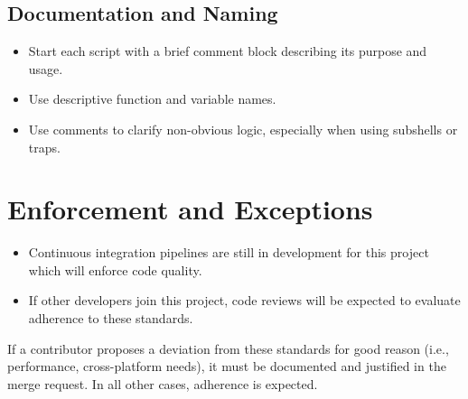 \subsection{Documentation and Naming}
\begin{itemize}\itemsep0em
    \item Start each script with a brief comment block describing its purpose and usage.
    \item Use descriptive function and variable names.
    \item Use comments to clarify non-obvious logic, especially when using subshells or traps.
\end{itemize}











\section{Enforcement and Exceptions}

\begin{itemize}\itemsep0em
    \item Continuous integration pipelines are still in development for this project which will enforce code quality.
    \item If other developers join this project, code reviews will be expected to evaluate adherence to these standards.
\end{itemize}

If a contributor proposes a deviation from these standards for good reason (i.e., performance, cross-platform needs), it must be documented and justified in the merge request. In all other cases, adherence is expected.





